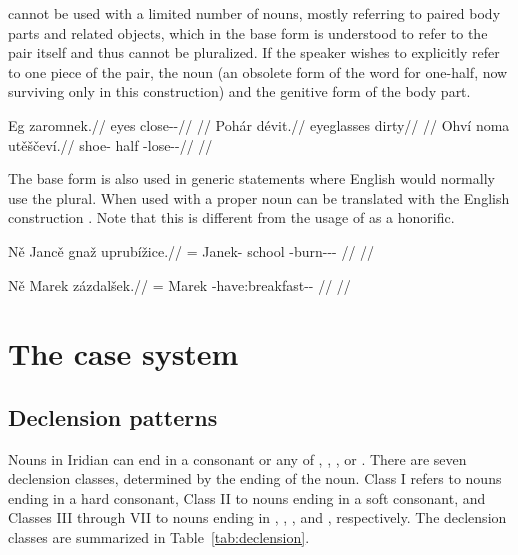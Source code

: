  cannot be used with a limited number of nouns, mostly referring to
paired body parts and related objects, which in the base form is understood to
refer to the pair itself and thus cannot be pluralized. If the speaker wishes to
explicitly refer to one piece of the pair, the noun  (an obsolete form
of the word for one-half, now surviving only in this construction) and the
genitive form of the body part.

\pex
\begingl
\gla Eg zaromnek.//
\glb eyes close-\Pv{}-\Pf{}//
\glft {}//
\endgl
\xe
\pex
\begingl
\gla Pohár dévit.//
\glb eyeglasses dirty//
\glft {}//
\endgl
\xe
\pex
\begingl
\gla Ohví noma utěščeví.//
\glb shoe-\Gen{} half \Refl{}-lose-\Av{}-\Cont{}//
\glft {}//
\endgl
\xe

The base form is also used in generic statements where English would normally
use the plural. When used with a
proper noun  can be translated with the English construction . Note that this is different from the usage of  as a honorific.

\pex
\begingl
    \gla Ně Jancě gnaž uprubížice.//
    \glb \Pl{}= Janek-\Gen{} school \Refl{}-burn-\Av{}-\Pf{}-\Quot{} //
    \glft {}//
\endgl
\xe

\pex
\begingl
    \gla Ně Marek zázdalšek.//
    \glb \Pl{}= Marek \Neg{}-have:breakfast-\Av{}-\Pf{} //
    \glft {}//
\endgl
\xe

\section{The case system}

\subsection{Declension patterns}

Nouns in Iridian can end in a consonant or any of , , ,
 or . There are seven declension classes, determined by the
ending of the noun. Class I refers to nouns ending in a hard consonant, Class II
to nouns ending in a soft consonant, and Classes III through VII to nouns ending
in , , ,  and , respectively. The
declension classes are summarized in Table~\ref{tab:declension}.

